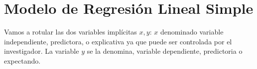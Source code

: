\section{Modelo de Regresión Lineal Simple}
Vamos a rotular las dos variables implícitas $x,y$: $x$ denominado variable independiente, predictora, o explicativa ya que puede ser controlada por el investigador. La variable $y$ se la denomina, variable dependiente, predictoria o expectando.